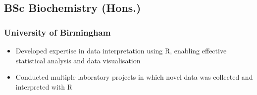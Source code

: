 \documentclass{article}
\begin{document}
\begin{paracol}{2}
  \subsection{BSc Biochemistry (Hons.)}
  \subsubsection{University of Birmingham}
  \hspace*{\fill}{\small Graduated 2019}
  \begin{itemize}[leftmargin=*]
    \setlength\itemsep{-2pt}
    \item Developed expertise in data interpretation using R, enabling effective statistical analysis and data visualisation
    \item Conducted multiple laboratory projects in which novel data was collected and interpreted with R
  \end{itemize}




\end{paracol}
\end{document}

